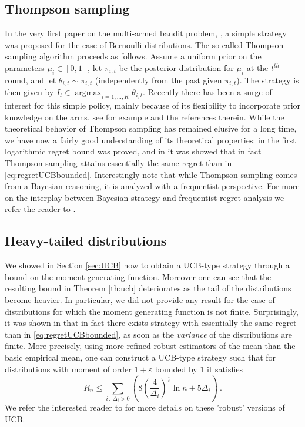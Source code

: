 \documentclass[11pt]{hackednow}
\renewcommand{\epsilon}{\varepsilon}
\newcommand{\argmax}{\mathop{\mathrm{argmax}}}
\begin{document}
\subsection{Thompson sampling}
In the very first paper on the multi-armed bandit problem, \cite{Tho33}, a simple strategy was proposed for the case of Bernoulli distributions. The so-called Thompson sampling algorithm proceeds as follows. Assume a uniform prior on the parameters $\mu_i \in [0,1]$, let $\pi_{i,t}$ be the posterior distribution for $\mu_i$ at the $t^{th}$ round, and let $\theta_{i,t} \sim \pi_{i,t}$ (independently from the past given $\pi_{i,t}$). The strategy is then given by $I_t \in \argmax_{i =1,\hdots, K} \theta_{i,t}$. Recently there has been a surge of interest for this simple policy, mainly because of its flexibility to incorporate prior knowledge on the arms, see for example \cite{CLi11} and the references therein. While the theoretical behavior of Thompson sampling has remained elusive for a long time, we have now a fairly good understanding of its theoretical properties: in \cite{AG12} the first logarithmic regret bound was proved, and in \cite{KKM12} it was showed that in fact Thompson sampling attains essentially the same regret than in \eqref{eq:regretUCBbounded}. Interestingly note that while Thompson sampling comes from a Bayesian reasoning, it is analyzed with a frequentist perspective. For more on the interplay between Bayesian strategy and frequentist regret analysis we refer the reader to \cite{KCG12}.

\subsection{Heavy-tailed distributions} \label{sec:heavytail}
We showed in Section \ref{sec:UCB} how to obtain a UCB-type strategy through a bound on the moment generating function. Moreover one can see that the resulting bound in Theorem \ref{th:ucb} deteriorates as the tail of the distributions become heavier. In particular, we did not provide any result for the case of distributions for which the moment generating function is not finite. Surprisingly, it was shown in \cite{BCL12} that in fact there exists strategy with essentially the same regret than in \eqref{eq:regretUCBbounded}, as soon as the {\em variance} of the distributions are finite. More precisely, using more refined robust estimators of the mean than the basic empirical mean, one can construct a UCB-type strategy such that for distributions with moment of order $1+\epsilon$ bounded by $1$ it satisfies
\[
R_n \leq \sum_{i \,:\, \Delta_i > 0} \left(8 \left(\frac{4}{\Delta_i}\right)^{\frac{1}{\epsilon}} \ln n + 5\Delta_i\right)~.
\]
We refer the interested reader to \cite{BCL12} for more details on these 'robust' versions of UCB.
 
\end{document}
